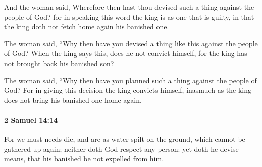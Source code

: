 			\begin{versebox}
					\item[BHS] 
					\item[ASV] And the woman said, Wherefore then hast thou devised such a thing against the people of God? for in speaking this word the king is as one that is guilty, in that the king doth not fetch home again his banished one.
					\item[NIV] The woman said, “Why then have you devised a thing like this against the people of God? When the king says this, does he not convict himself, for the king has not brought back his banished son?
					\item[NRSV] The woman said, “Why then have you planned such a thing against the people of God? For in giving this decision the king convicts himself, inasmuch as the king does not bring his banished one home again.
			\end{versebox}

		\paragraph{2 Samuel 14:14} %
			\label{2SAMUEL-14-14}

			For we must needs die, and are as water spilt on the ground, which cannot be gathered up again; neither doth God respect any person: yet doth he devise means, that his banished be not expelled from him.

